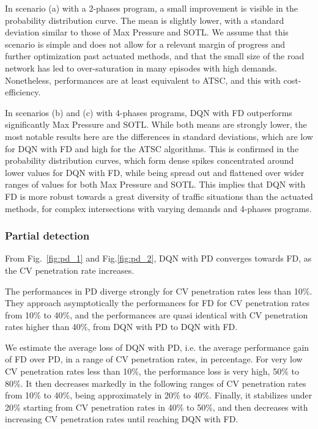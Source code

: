 \documentclass[journal]{IEEEtran}
\begin{document}
In scenario (a) with a 2-phases program, a small improvement is visible in the probability distribution curve. The mean is slightly lower, with a standard deviation similar to those of Max Pressure and SOTL. We assume that this scenario is simple and does not allow for a relevant margin of progress and further optimization past actuated methods, and that the small size of the road network has led to over-saturation in many episodes with high demands. Nonetheless, performances are at least equivalent to ATSC, and this with cost-efficiency.

In scenarios (b) and (c) with 4-phases programs, DQN with FD outperforms significantly Max Pressure and SOTL. While both means are strongly lower, the most notable results here are the differences in standard deviations, which are low for DQN with FD and high for the ATSC algorithms. This is confirmed in the probability distribution curves, which form dense spikes concentrated around lower values for DQN with FD, while being spread out and flattened over wider ranges of values for both Max Pressure and SOTL. This implies that DQN with FD is more robust towards a great diversity of traffic situations than the actuated methods, for complex intersections with varying demands and 4-phases programs.\\

\subsubsection{Partial detection}
From Fig.~\ref{fig:pd_1} and Fig.\ref{fig:pd_2}, DQN with PD converges towards FD, as the CV penetration rate increases. 

The performances in PD diverge strongly for CV penetration rates less than 10\%. They approach asymptotically the performances for FD for CV penetration rates from 10\% to 40\%, and the performances are quasi identical with CV penetration rates higher than 40\%, from DQN with PD to DQN with FD.

We estimate the average loss of DQN with PD, i.e. the average performance gain of FD over PD, in a range of CV penetration rates, in percentage. For very low CV penetration rates less than 10\%, the performance loss is very high, 50\% to 80\%. It then decreases markedly in the following ranges of CV penetration rates from 10\% to 40\%, being approximately in 20\% to 40\%. Finally, it stabilizes under 20\% starting from CV penetration rates in 40\% to 50\%, and then decreases with increasing CV penetration rates until reaching DQN with FD.
\end{document}
